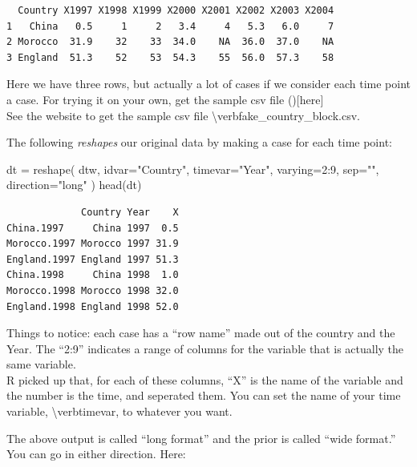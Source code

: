 \documentclass[
  letterpaper,
  DIV=11,
  numbers=noendperiod]{scrreprt}
\newenvironment{Shaded}{\begin{snugshade}}{\end{snugshade}}
\newcommand{\AttributeTok}[1]{\textcolor[rgb]{0.49,0.56,0.16}{#1}}
\newcommand{\DecValTok}[1]{\textcolor[rgb]{0.25,0.63,0.44}{#1}}
\newcommand{\FunctionTok}[1]{\textcolor[rgb]{0.02,0.16,0.49}{#1}}
\newcommand{\NormalTok}[1]{\textcolor[rgb]{0.00,0.44,0.13}{#1}}
\newcommand{\OtherTok}[1]{\textcolor[rgb]{0.00,0.44,0.13}{#1}}
\newcommand{\SpecialCharTok}[1]{\textcolor[rgb]{0.25,0.44,0.63}{#1}}
\newcommand{\StringTok}[1]{\textcolor[rgb]{0.25,0.44,0.63}{#1}}
\begin{document}
\begin{verbatim}
  Country X1997 X1998 X1999 X2000 X2001 X2002 X2003 X2004
1   China   0.5     1     2   3.4     4   5.3   6.0     7
2 Morocco  31.9    32    33  34.0    NA  36.0  37.0    NA
3 England  51.3    52    53  54.3    55  56.0  57.3    58
\end{verbatim}

Here we have three rows, but actually a lot of cases if we consider each
time point a case. For trying it on your own, get the sample csv file
(){[}here{]}\\
See the website to get the sample csv file
\textbackslash verb\textbar fake\_country\_block.csv\textbar.

The following \emph{reshapes} our original data by making a case for
each time point:

\begin{Shaded}
\begin{Highlighting}[]
\NormalTok{dt }\OtherTok{=} \FunctionTok{reshape}\NormalTok{( dtw, }\AttributeTok{idvar=}\StringTok{"Country"}\NormalTok{, }\AttributeTok{timevar=}\StringTok{"Year"}\NormalTok{, }\AttributeTok{varying=}\DecValTok{2}\SpecialCharTok{:}\DecValTok{9}\NormalTok{, }\AttributeTok{sep=}\StringTok{""}\NormalTok{, }\AttributeTok{direction=}\StringTok{"long"}\NormalTok{ )}
\FunctionTok{head}\NormalTok{(dt)}
\end{Highlighting}
\end{Shaded}

\begin{verbatim}
             Country Year    X
China.1997     China 1997  0.5
Morocco.1997 Morocco 1997 31.9
England.1997 England 1997 51.3
China.1998     China 1998  1.0
Morocco.1998 Morocco 1998 32.0
England.1998 England 1998 52.0
\end{verbatim}

Things to notice: each case has a ``row name'' made out of the country
and the Year. The ``2:9'' indicates a range of columns for the variable
that is actually the same variable.\\
R picked up that, for each of these columns, ``X'' is the name of the
variable and the number is the time, and seperated them. You can set the
name of your time variable, \textbackslash verb\textbar timevar\textbar,
to whatever you want.

The above output is called ``long format'' and the prior is called
``wide format.''\\
You can go in either direction. Here:
\end{document}
